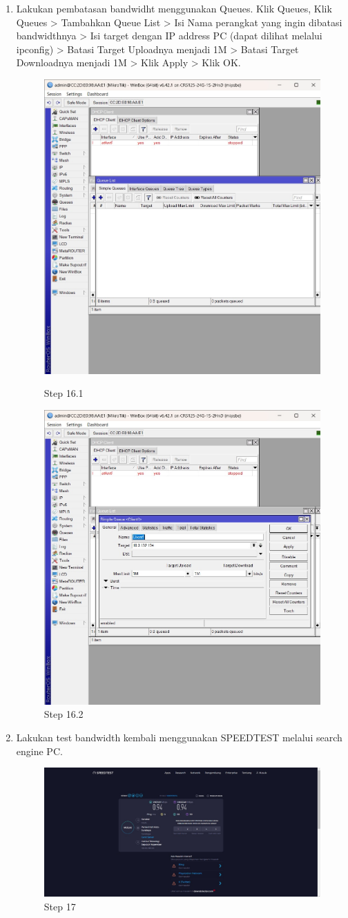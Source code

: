 \begin{enumerate}
	\item Lakukan pembatasan bandwidht menggunakan Queues. Klik Queues, Klik Queues > Tambahkan Queue List > Isi Nama perangkat yang ingin dibatasi bandwidthnya > Isi target dengan IP
	address PC (dapat dilihat melalui ipconfig) > Batasi Target Uploadnya menjadi 1M > Batasi Target Downloadnya menjadi 1M > Klik Apply > Klik OK.	
	\begin{figure}[H]
		\centering
		\includegraphics[width=0.5\linewidth]{P3/img/step16.jpg}
		\caption{Step 16.1}
		\label{fig:gambar4}

		\centering
		\includegraphics[width=0.5\linewidth]{P3/img/step16.2.jpg}
		\caption{Step 16.2}
		\label{fig:gambar4}
	\end{figure}

	\item Lakukan test bandwidth kembali menggunakan SPEEDTEST melalui search engine PC.
	\begin{figure}[H]
		\centering
		\includegraphics[width=0.5\linewidth]{P3/img/step17.jpg}
		\caption{Step 17}
		\label{fig:gambar4}
	\end{figure}

\end{enumerate}


